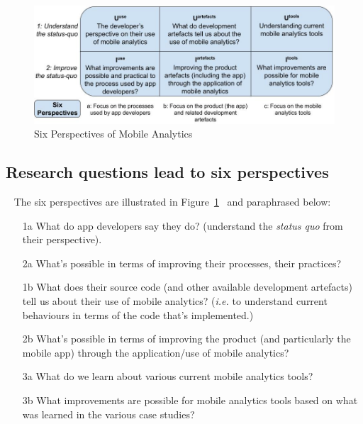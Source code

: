 \begin{figure}
    \includegraphics[width=\linewidth]{images/my/six-perspectives-2x3-matrix-12-nov-2021.jpeg}
    \caption{Six Perspectives of Mobile Analytics}
    \label{fig:six-perspectives-in-the-research-questions-section}
\end{figure}

\subsection{Research questions lead to six perspectives}~\label{rq-leads-to-six-perspectives}
The six perspectives are illustrated in Figure~\ref{fig:six-perspectives-in-the-research-questions-section}~ and paraphrased below:

\begin{enumerate}
    \item [1a] What do app developers say they do? (understand the \emph{status quo} from their perspective).
    \item [2a] What's possible in terms of improving their processes, their practices?
    \item [1b] What does their source code (and other available development artefacts) tell us about their use of mobile analytics? (\emph{i.e.} to understand current behaviours in terms of the code that's implemented.)
    \item [2b] What's possible in terms of improving the product (and particularly the mobile app) through the application/use of mobile analytics?
    \item [3a] What do we learn about various current mobile analytics tools?
    \item [3b] What improvements are possible for mobile analytics tools based on what was learned in the various case studies?
\end{enumerate}

